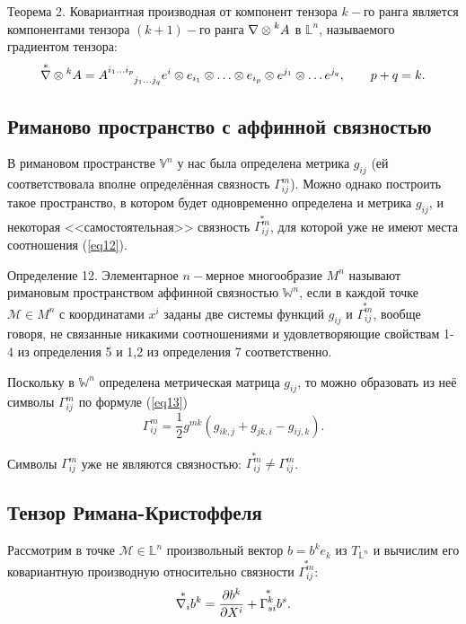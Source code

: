 \documentclass[14pt,a4paper]{extarticle}
\begin{document}
Теорема 2. Ковариантная производная от компонент тензора $k-$го ранга является компонентами тензора $(k+1)-$го ранга $\nabla \otimes \prescript{k}{}{A}$ в $\mathbb{L}^n$, называемого градиентом тензора:
\begin{equation}\label{eq26}
	\overset{*}{\nabla} \otimes \prescript{k}{}{A} = A\indices{^{i_1 \ldots i_p}_{j_1 \ldots j_q}} e^i \otimes e_{i_1} \otimes \ldots \otimes e_{i_p} \otimes e^{j_1} \otimes \ldots e^{j_q}, \qquad p+q=k.
\end{equation}

\subsection{Риманово пространство с аффинной связностью}
В римановом пространстве $\mathbb{V}^n$ у нас была определена метрика $g_{ij}$ (ей соответствовала вполне определённая связность $\Gamma_{ij}^m$). Можно однако построить такое пространство, в котором будет одновременно определена и метрика $g_{ij}$, и некоторая <<самостоятельная>> связность  $\overset{*}{\Gamma_{ij}^m}$, для которой уже не имеют места соотношения (\ref{eq12}).

Определение 12. Элементарное $n-$мерное многообразие $M^n$ называют римановым пространством аффинной связностью $\mathbb{W}^n$, если в каждой точке $\mathcal{M} \in M^n$ с координатами $x^i$ заданы две системы функций $g_{ij}$ и $\overset{*}{\Gamma_{ij}^m}$, вообще говоря, не связанные никакими соотношениями и удовлетворяющие свойствам 1-4 из определения 5 и 1,2 из определения 7 соответственно.

Поскольку в $\mathbb{W}^n$ определена метрическая матрица $g_{ij}$, то можно образовать из неё символы $\Gamma_{ij}^m$ по формуле (\ref{eq13})
\begin{equation}\label{eq27}
 \Gamma_{ij}^m = \frac{1}{2}g^{mk}(g_{ik,j} + g_{jk,i} - g_{ij,k}).
\end{equation}

Символы $\Gamma_{ij}^m$ уже не являются связностью: $\overset{*}{\Gamma_{ij}^m} \neq  \Gamma_{ij}^m$.


\subsection{Тензор Римана-Кристоффеля}
Рассмотрим в точке $\mathcal{M} \in \mathbb{L}^n$ произвольный вектор $b = b^ke_k$ из $T_{\mathbb{L}^n}$ и вычислим его ковариантную производную относительно связности $\overset{*}{\Gamma_{ij}^m}$:
\begin{equation} \label{eq 28}
	\overset{*}{\nabla_i}b^k = \pdv{b^k}{X^i} + \overset{*}{\Gamma_{si}^k}b^s.
\end{equation}
\end{document}
